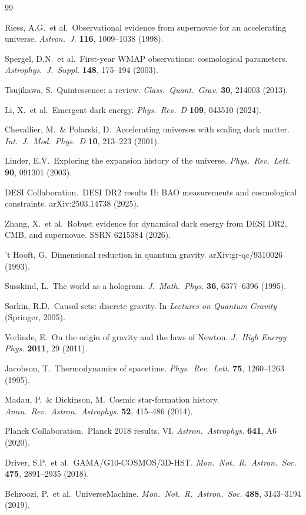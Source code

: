 \documentclass[12pt,a4paper]{article}
\begin{document}
\begin{thebibliography}{99}

Riess, A.G.\ et al.\ Observational evidence from supernovae for an accelerating universe. {\it Astron.\ J.} {\bf 116}, 1009--1038 (1998).

Spergel, D.N.\ et al.\ First-year WMAP observations: cosmological parameters. {\it Astrophys.\ J.\ Suppl.} {\bf 148}, 175--194 (2003).

Tsujikawa, S.\ Quintessence: a review. {\it Class.\ Quant.\ Grav.} {\bf 30}, 214003 (2013).

Li, X.\ et al.\ Emergent dark energy. {\it Phys.\ Rev.\ D} {\bf 109}, 043510 (2024).

Chevallier, M.\ \& Polarski, D.\ Accelerating universes with scaling dark matter. {\it Int.\ J.\ Mod.\ Phys.\ D} {\bf 10}, 213--223 (2001).

Linder, E.V.\ Exploring the expansion history of the universe. {\it Phys.\ Rev.\ Lett.} {\bf 90}, 091301 (2003).

DESI Collaboration.\ DESI DR2 results II: BAO measurements and cosmological constraints. arXiv:2503.14738 (2025).

Zhang, X.\ et al.\ Robust evidence for dynamical dark energy from DESI DR2, CMB, and supernovae. SSRN 6215384 (2026).

't Hooft, G.\ Dimensional reduction in quantum gravity. arXiv:gr-qc/9310026 (1993).

Susskind, L.\ The world as a hologram. {\it J.\ Math.\ Phys.} {\bf 36}, 6377--6396 (1995).

Sorkin, R.D.\ Causal sets: discrete gravity. In {\it Lectures on Quantum Gravity} (Springer, 2005).

Verlinde, E.\ On the origin of gravity and the laws of Newton. {\it J.\ High Energy Phys.} {\bf 2011}, 29 (2011).

Jacobson, T.\ Thermodynamics of spacetime. {\it Phys.\ Rev.\ Lett.} {\bf 75}, 1260--1263 (1995).

Madau, P.\ \& Dickinson, M.\ Cosmic star-formation history. {\it Annu.\ Rev.\ Astron.\ Astrophys.} {\bf 52}, 415--486 (2014).

Planck Collaboration.\ Planck 2018 results. VI. {\it Astron.\ Astrophys.} {\bf 641}, A6 (2020).

Driver, S.P.\ et al.\ GAMA/G10-COSMOS/3D-HST. {\it Mon.\ Not.\ R.\ Astron.\ Soc.} {\bf 475}, 2891--2935 (2018).

Behroozi, P.\ et al.\ UniverseMachine. {\it Mon.\ Not.\ R.\ Astron.\ Soc.} {\bf 488}, 3143--3194 (2019).

\end{thebibliography}
\end{document}
